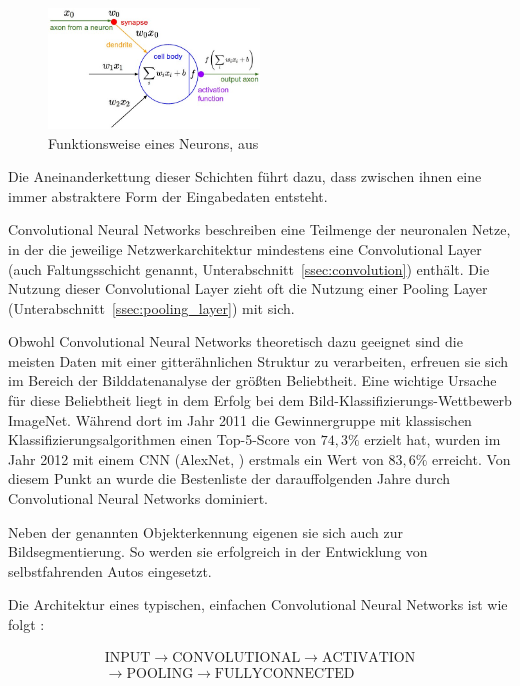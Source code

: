 \begin{figure}[h!]
	\centering
	\includegraphics[width=0.5\textwidth,keepaspectratio]{images/LJY19/neuron.jpg}
	\caption{Funktionsweise eines Neurons, aus \cite{cs231n}}
	\label{fig:neuron}
\end{figure}

Die Aneinanderkettung dieser Schichten führt dazu, dass zwischen ihnen eine immer abstraktere Form der Eingabedaten entsteht.

Convolutional Neural Networks beschreiben eine Teilmenge der neuronalen Netze, in der die jeweilige Netzwerkarchitektur mindestens eine Convolutional Layer (auch Faltungsschicht genannt, \vgl Unterabschnitt~\ref{ssec:convolution}) enthält. Die Nutzung dieser Convolutional Layer zieht oft die Nutzung einer Pooling Layer (Unterabschnitt~\ref{ssec:pooling_layer}) mit sich. \cite{deeplearning_16}

Obwohl Convolutional Neural Networks theoretisch dazu geeignet sind die meisten Daten mit einer gitterähnlichen Struktur zu verarbeiten, erfreuen sie sich im Bereich der Bilddatenanalyse der größten Beliebtheit. \cite[Kap.~9]{deeplearning_16} Eine wichtige Ursache für diese Beliebtheit liegt \bspw in dem Erfolg bei dem Bild-Klassifizierungs-Wettbewerb ImageNet. Während dort im Jahr 2011 die Gewinnergruppe mit klassischen Klassifizierungsalgorithmen einen Top-5-Score von $74,3\%$ erzielt hat, wurden im Jahr 2012 mit einem CNN (AlexNet, \cite{alexnet}) erstmals ein Wert von $83,6\%$ erreicht. Von diesem Punkt an wurde die Bestenliste der darauffolgenden Jahre durch Convolutional Neural Networks dominiert. \cite[Kap.~1]{deeplearning_18}

Neben der genannten Objekterkennung eigenen sie sich auch zur Bildsegmentierung. So werden sie \bspw erfolgreich in der Entwicklung von selbstfahrenden Autos eingesetzt. \cite{kaymak_19}

Die Architektur eines typischen, einfachen Convolutional Neural Networks ist wie folgt \cite{cs231n}:

\begin{multline*}
\mathrm{INPUT}\rightarrow\mathrm{CONVOLUTIONAL}\rightarrow\mathrm{ACTIVATION}\\\rightarrow\mathrm{POOLING}\rightarrow\mathrm{FULLYCONNECTED}
\end{multline*}


